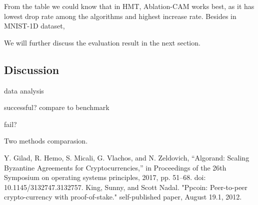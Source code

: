 \documentclass[conference]{IEEEtran}
\begin{document}
From the table we could know that in HMT, Ablation-CAM works best, as it has lowest drop rate among the algorithms and highest increase rate. Besides in MNIST-1D dataset, %
\par
We will further discuss the evaluation result in the next section.

\subsection{Discussion}

data analysis

successful? compare to benchmark

fail?

Two methods comparasion.

\begin{thebibliography}{00}
Y. Gilad, R. Hemo, S. Micali, G. Vlachos, and N. Zeldovich, “Algorand: Scaling Byzantine Agreements for Cryptocurrencies,” in Proceedings of the 26th Symposium on operating systems principles, 2017, pp. 51–68. doi: 10.1145/3132747.3132757.
 King, Sunny, and Scott Nadal. "Ppcoin: Peer-to-peer crypto-currency with proof-of-stake." self-published paper, August 19.1, 2012.

\end{thebibliography}
\end{document}

